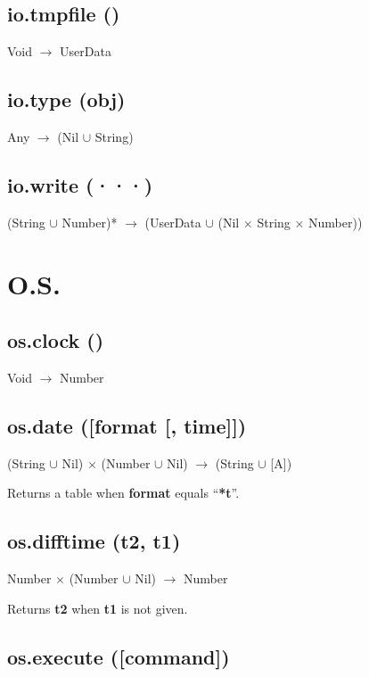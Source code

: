 \documentclass[12pt]{article}
\begin{document}
\subsection{io.tmpfile ()}

Void $\rightarrow$ UserData

\subsection{io.type (obj)}

Any $\rightarrow$
(Nil $\cup$ String)

\subsection{io.write (···)}

(String $\cup$ Number)* $\rightarrow$
(UserData $\cup$ (Nil $\times$ String $\times$ Number))

\newpage

\section{O.S.}

\subsection{os.clock ()}

Void $\rightarrow$ Number

\subsection{os.date ([format [, time]])}

(String $\cup$ Nil) $\times$
(Number $\cup$ Nil) $\rightarrow$
(String $\cup$ [A])

Returns a table when \textbf{format} equals ``\textbf{*t}''.

\subsection{os.difftime (t2, t1)}

Number $\times$ (Number $\cup$ Nil) $\rightarrow$
Number

Returns \textbf{t2} when \textbf{t1} is not given.

\subsection{os.execute ([command])}
\end{document}
